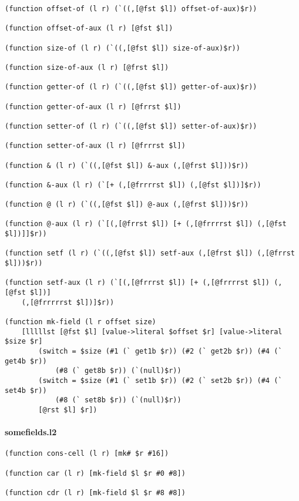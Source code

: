 \documentclass[]{article}
\let\oldparagraph\paragraph
\renewcommand{\paragraph}[1]{\oldparagraph{#1}\mbox{}}
\begin{document}
\begin{verbatim}
(function offset-of (l r) (`((,[@fst $l]) offset-of-aux)$r))

(function offset-of-aux (l r) [@fst $l])

(function size-of (l r) (`((,[@fst $l]) size-of-aux)$r))

(function size-of-aux (l r) [@frst $l])

(function getter-of (l r) (`((,[@fst $l]) getter-of-aux)$r))

(function getter-of-aux (l r) [@frrst $l])

(function setter-of (l r) (`((,[@fst $l]) setter-of-aux)$r))

(function setter-of-aux (l r) [@frrrst $l])

(function & (l r) (`((,[@fst $l]) &-aux (,[@frst $l]))$r))

(function &-aux (l r) (`[+ (,[@frrrrst $l]) (,[@fst $l])]$r))

(function @ (l r) (`((,[@fst $l]) @-aux (,[@frst $l]))$r))

(function @-aux (l r) (`[(,[@frrst $l]) [+ (,[@frrrrst $l]) (,[@fst $l])]]$r))

(function setf (l r) (`((,[@fst $l]) setf-aux (,[@frst $l]) (,[@frrst $l]))$r))

(function setf-aux (l r) (`[(,[@frrrst $l]) [+ (,[@frrrrst $l]) (,[@fst $l])]
    (,[@frrrrrst $l])]$r))

(function mk-field (l r offset size)
    [lllllst [@fst $l] [value->literal $offset $r] [value->literal $size $r]
        (switch = $size (#1 (` get1b $r)) (#2 (` get2b $r)) (#4 (` get4b $r))
            (#8 (` get8b $r)) (`(null)$r))
        (switch = $size (#1 (` set1b $r)) (#2 (` set2b $r)) (#4 (` set4b $r))
            (#8 (` set8b $r)) (`(null)$r))
        [@rst $l] $r])
\end{verbatim}

\hypertarget{somefields.l2}{%
\paragraph{somefields.l2}\label{somefields.l2}}

\begin{verbatim}
(function cons-cell (l r) [mk# $r #16])

(function car (l r) [mk-field $l $r #0 #8])

(function cdr (l r) [mk-field $l $r #8 #8])
\end{verbatim}
\end{document}

